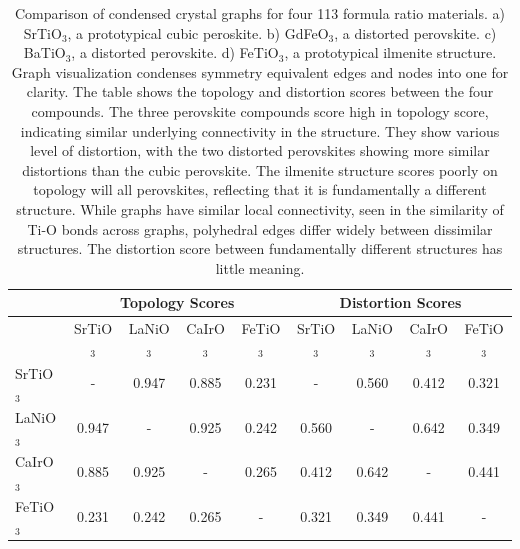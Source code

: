 \begin{table}
\begin{tabular}{l|cccc|cccc}
        & \multicolumn{4}{c|}{Topology Scores} & \multicolumn{4}{c}{Distortion Scores}\\
        \hline
         & SrTiO$_3$  & LaNiO$_3$  & CaIrO$_3$ & FeTiO$_3$  & SrTiO$_3$  & LaNiO$_3$   & CaIrO$_3$   & FeTiO$_3$ \\
        \hline
        SrTiO$_3$ & - & 0.947 & 0.885 & 0.231 & - & 0.560 & 0.412&  0.321\\
        LaNiO$_3$ & 0.947 & - & 0.925 & 0.242 & 0.560 & - & 0.642 & 0.349\\
        CaIrO$_3$ & 0.885 & 0.925& - & 0.265 & 0.412 & 0.642 & - & 0.441\\
        FeTiO$_3$ & 0.231 & 0.242& 0.265 & - & 0.321 & 0.349& 0.441 & - \\
        \hline
    \end{tabular}
    \captionsetup{justification=centering}
    \caption{Comparison of condensed crystal graphs for four 113 formula ratio materials. a) SrTiO$_3$, a prototypical cubic peroskite. b) GdFeO$_3$, a distorted perovskite. c) BaTiO$_3$, a distorted perovskite. d) FeTiO$_3$, a prototypical ilmenite structure. Graph visualization condenses symmetry equivalent edges and nodes into one for clarity. The table shows the topology and distortion scores between the four compounds. The three perovskite compounds score high in topology score, indicating similar underlying connectivity in the structure. They show various level of distortion, with the two distorted perovskites showing more similar distortions than the cubic perovskite. The ilmenite structure scores poorly on topology will all perovskites, reflecting that it is fundamentally a different structure. While graphs have similar local connectivity, seen in the similarity of Ti-O bonds across graphs, polyhedral edges differ widely between dissimilar structures. The distortion score between fundamentally different structures has little meaning.}
    \label{fig:113_example_fig_and_table_new}
\end{table}
